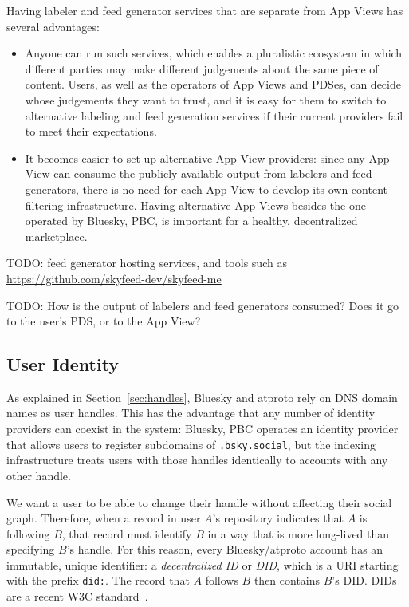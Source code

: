 \documentclass[sigconf,review]{acmart}
\begin{document}
Having labeler and feed generator services that are separate from App Views has several advantages:
\begin{itemize}
    \item Anyone can run such services, which enables a pluralistic ecosystem in which different parties may make different judgements about the same piece of content.
        Users, as well as the operators of App Views and PDSes, can decide whose judgements they want to trust, and it is easy for them to switch to alternative labeling and feed generation services if their current providers fail to meet their expectations.
    \item It becomes easier to set up alternative App View providers: since any App View can consume the publicly available output from labelers and feed generators, there is no need for each App View to develop its own content filtering infrastructure.
        Having alternative App Views besides the one operated by Bluesky, PBC, is important for a healthy, decentralized marketplace.
\end{itemize}

TODO: feed generator hosting services, and tools such as \url{https://github.com/skyfeed-dev/skyfeed-me}

TODO: How is the output of labelers and feed generators consumed? Does it go to the user's PDS, or to the App View?

\subsection{User Identity}\label{sec:identity}

As explained in Section~\ref{sec:handles}, Bluesky and atproto rely on DNS domain names as user handles.
This has the advantage that any number of identity providers can coexist in the system: Bluesky, PBC operates an identity provider that allows users to register subdomains of \texttt{.bsky.social}, but the indexing infrastructure treats users with those handles identically to accounts with any other handle.

We want a user to be able to change their handle without affecting their social graph.
Therefore, when a record in user $A$'s repository indicates that $A$ is following $B$, that record must identify $B$ in a way that is more long-lived than specifying $B$'s handle.
For this reason, every Bluesky/atproto account has an immutable, unique identifier: a \emph{decentralized ID} or \emph{DID}, which is a URI starting with the prefix \texttt{did:}.
The record that $A$ follows $B$ then contains $B$'s DID.
DIDs are a recent W3C standard~\cite{DIDCore}.
\end{document}

